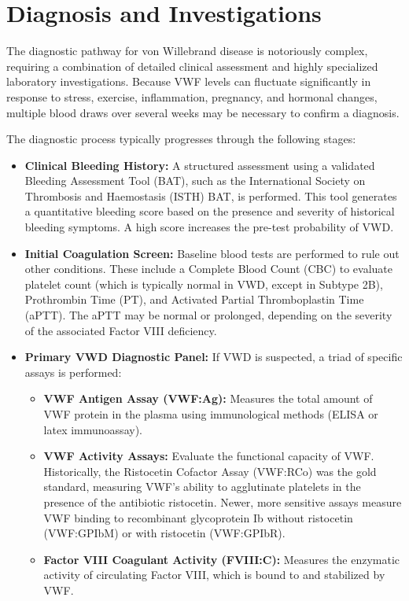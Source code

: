 \section*{Diagnosis and Investigations}
The diagnostic pathway for von Willebrand disease is notoriously complex, requiring a combination of detailed clinical assessment and highly specialized laboratory investigations. Because VWF levels can fluctuate significantly in response to stress, exercise, inflammation, pregnancy, and hormonal changes, multiple blood draws over several weeks may be necessary to confirm a diagnosis.

The diagnostic process typically progresses through the following stages:
\begin{itemize}
    \item \textbf{Clinical Bleeding History:} A structured assessment using a validated Bleeding Assessment Tool (BAT), such as the International Society on Thrombosis and Haemostasis (ISTH) BAT, is performed. This tool generates a quantitative bleeding score based on the presence and severity of historical bleeding symptoms. A high score increases the pre-test probability of VWD.
    \item \textbf{Initial Coagulation Screen:} Baseline blood tests are performed to rule out other conditions. These include a Complete Blood Count (CBC) to evaluate platelet count (which is typically normal in VWD, except in Subtype 2B), Prothrombin Time (PT), and Activated Partial Thromboplastin Time (aPTT). The aPTT may be normal or prolonged, depending on the severity of the associated Factor VIII deficiency.
    \item \textbf{Primary VWD Diagnostic Panel:} If VWD is suspected, a triad of specific assays is performed:
    \begin{itemize}
        \item \textbf{VWF Antigen Assay (VWF:Ag):} Measures the total amount of VWF protein in the plasma using immunological methods (ELISA or latex immunoassay).
        \item \textbf{VWF Activity Assays:} Evaluate the functional capacity of VWF. Historically, the Ristocetin Cofactor Assay (VWF:RCo) was the gold standard, measuring VWF's ability to agglutinate platelets in the presence of the antibiotic ristocetin. Newer, more sensitive assays measure VWF binding to recombinant glycoprotein Ib without ristocetin (VWF:GPIbM) or with ristocetin (VWF:GPIbR).
        \item \textbf{Factor VIII Coagulant Activity (FVIII:C):} Measures the enzymatic activity of circulating Factor VIII, which is bound to and stabilized by VWF.

\end{itemize}
\end{itemize}
